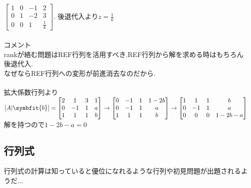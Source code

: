 $\begin{bmatrix}
    1 & 0 & -1 & 2 \\
    0 & 1 & -2 & 3 \\
    0 & 0 & 1 & \frac{1}{k}
\end{bmatrix}$.
後退代入より$\displaystyle z=\frac{1}{k}$\\\\
コメント\\
rankが絡む問題はREF行列を活用すべき.REF行列から解を求める時はもちろん後退代入.\\なぜならREF行列への変形が前進消去なのだから.\\
\\
拡大係数行列より\\
$[A|\symbfit{b}]=
\begin{bmatrix}
    2 & 1 & 3 & 1\\
    0 & -1 & 1 & a\\
    1 & 1 & 1 & b
\end{bmatrix}\rightarrow
\begin{bmatrix}
    0 & -1 & 1 & 1-2b \\
    0 & -1 & 1 & a \\
    1 & 1 & 1 & b
\end{bmatrix} \rightarrow
\begin{bmatrix}
    1 & 1 & 1 & b \\
    0 & -1 & 1 & a \\
    0 & 0 & 0 & 1-2b-a
\end{bmatrix}$\\
解を持つので$1-2b-a=0$
\subsection{行列式}
行列式の計算は知っていると優位になれるような行列や初見問題が出題されるようだ...
